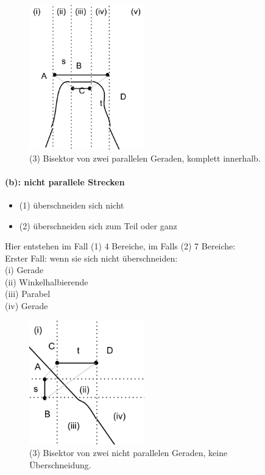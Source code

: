 \begin{figure}[h]
\begin{center}
\includegraphics[width=5cm]{img/ss4.png}
\end{center}
\caption{(3) Bisektor von zwei parallelen Geraden, komplett innerhalb.}
\label{fig:a4}
\end{figure}

\newpage

\paragraph*{(b): nicht parallele Strecken}

\begin{itemize}
\item (1) überschneiden sich nicht
\item (2) überschneiden sich zum Teil oder ganz
\end{itemize}

Hier entstehen im Fall (1) 4 Bereiche, im Falls (2) 7 Bereiche:\\

Erster Fall: wenn sie sich nicht überschneiden:\\
(i) Gerade\\
(ii) Winkelhalbierende\\
(iii) Parabel\\
(iv) Gerade\\

\begin{figure}[h!]
\begin{center}
\includegraphics[width=5cm]{img/ssnpout.png}
\end{center}
\caption{(3) Bisektor von zwei nicht parallelen Geraden, keine Überschneidung.}
\label{fig:a5}
\end{figure}

